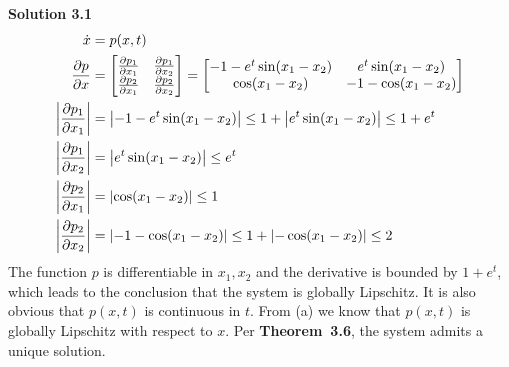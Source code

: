 \documentclass[a4paper,10.5pt]{article}
\newcommand{\abs}[1]{\left|#1\right|}
\newenvironment{mymat}{\left[\begin{matrix}}{\end{matrix}\right]}
\begin{document}
\noindent \textbf {Solution 3.1} \\
\begin{align*}
	\dot{x} &= p(x,t) \\
	\frac{\partial p}{\partial x} &=  \begin{mymat}\frac{\partial p_1}{\partial x_1} & \frac{\partial p_1}{\partial x_2} \\
	\frac{\partial p_2}{\partial x_1} & \frac{\partial p_2}{\partial x_2}
	\end{mymat} = \begin{mymat}
	-1 - e^t \sin(x_1-x_2) & e^t \sin (x_1-x_2) \\
	\cos(x_1-x_2) & -1-\cos(x_1-x_2)
	\end{mymat} \\
	\abs{\frac{\partial p_1}{\partial x_1}} &=  \abs{-1 - e^t \sin(x_1-x_2)} \leq 1+\abs{e^t \sin(x_1-x_2)} \leq 1+e^t\\
	\abs{\frac{\partial p_1}{\partial x_2}} &= \abs{e^t \sin (x_1-x_2)} \leq e^t\\
	\abs{\frac{\partial p_2}{\partial x_1}} &= \abs{\cos(x_1-x_2)} \leq 1\\
	\abs{\frac{\partial p_2}{\partial x_2}} &=\abs{-1-\cos(x_1-x_2)}\leq 1 + \abs{-\cos(x_1-x_2)} \leq 2\\
\end{align*}
The function $p$ is differentiable in $x_1,x_2$ and the derivative is bounded by $1+e^t$, which leads to the conclusion that the system is globally Lipschitz. It is also obvious that $p(x,t)$ is continuous in $t$. From (a) we know that $p(x,t)$ is globally Lipschitz with respect to $x$. Per \textbf{Theorem~{3.6}}, the system admits a unique solution. \\

\clearpage
\end{document}
